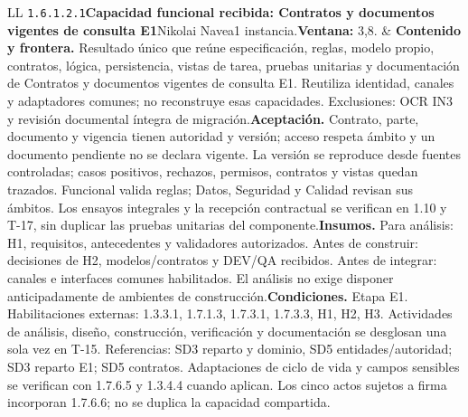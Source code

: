 \begin{longtable}{L{\tabcolsep\relax}L{\tabcolsep\relax}}
\texttt{1.\allowbreak{}6.\allowbreak{}1.\allowbreak{}2.\allowbreak{}1}\newline{}\textbf{Capacidad funcional recibida: Contratos y documentos vigentes de consulta E1}\newline{}Nikolai Navea\newline{}1 instancia.\newline{}\textbf{Ventana:} 3,8. & \textbf{Contenido y frontera.} Resultado único que reúne especificación, reglas, modelo propio, contratos, lógica, persistencia, vistas de tarea, pruebas unitarias y documentación de Contratos y documentos vigentes de consulta E1. Reutiliza identidad, canales y adaptadores comunes; no reconstruye esas capacidades. Exclusiones: OCR IN3 y revisión documental íntegra de migración.\newline{}\textbf{Aceptación.} Contrato, parte, documento y vigencia tienen autoridad y versión; acceso respeta ámbito y un documento pendiente no se declara vigente. La versión se reproduce desde fuentes controladas; casos positivos, rechazos, permisos, contratos y vistas quedan trazados. Funcional valida reglas; Datos, Seguridad y Calidad revisan sus ámbitos. Los ensayos integrales y la recepción contractual se verifican en 1.10 y T-17, sin duplicar las pruebas unitarias del componente.\newline{}\textbf{Insumos.} Para análisis: H1, requisitos, antecedentes y validadores autorizados. Antes de construir: decisiones de H2, modelos/contratos y DEV/QA recibidos. Antes de integrar: canales e interfaces comunes habilitados. El análisis no exige disponer anticipadamente de ambientes de construcción.\newline{}\textbf{Condiciones.} Etapa E1. Habilitaciones externas: 1.3.3.1, 1.7.1.3, 1.7.3.1, 1.7.3.3, H1, H2, H3. Actividades de análisis, diseño, construcción, verificación y documentación se desglosan una sola vez en T-15. Referencias: SD3 reparto y dominio, SD5 entidades/autoridad; SD3 reparto E1; SD5 contratos. Adaptaciones de ciclo de vida y campos sensibles se verifican con 1.7.6.5 y 1.3.4.4 cuando aplican. Los cinco actos sujetos a firma incorporan 1.7.6.6; no se duplica la capacidad compartida.\\\hline

\end{longtable}
